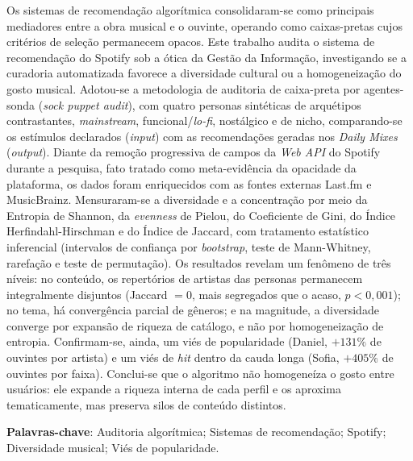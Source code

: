 \documentclass[12pt, %
openright,
oneside, %
a4paper,    %
english,   %
brazil]{facom-ufu-abntex2}
\begin{document}
\begin{resumo}
Os sistemas de recomendação algorítmica consolidaram-se como principais
mediadores entre a obra musical e o ouvinte, operando como caixas-pretas cujos
critérios de seleção permanecem opacos. Este trabalho audita o sistema de
recomendação do Spotify sob a ótica da Gestão da Informação, investigando se a
curadoria automatizada favorece a diversidade cultural ou a homogeneização do
gosto musical. Adotou-se a metodologia de auditoria de caixa-preta por
agentes-sonda (\emph{sock puppet audit}), com quatro personas sintéticas de
arquétipos contrastantes, \emph{mainstream}, funcional/\emph{lo-fi},
nostálgico e de nicho, comparando-se os estímulos declarados (\emph{input})
com as recomendações geradas nos \emph{Daily Mixes} (\emph{output}). Diante da
remoção progressiva de campos da \emph{Web API} do Spotify durante a pesquisa,
fato tratado como meta-evidência da opacidade da plataforma, os dados
foram enriquecidos com as fontes externas Last.fm e MusicBrainz. Mensuraram-se a
diversidade e a concentração por meio da Entropia de Shannon, da \emph{evenness}
de Pielou, do Coeficiente de Gini, do Índice Herfindahl-Hirschman e do Índice de
Jaccard, com tratamento estatístico inferencial (intervalos de confiança por
\emph{bootstrap}, teste de Mann-Whitney, rarefação e teste de permutação). Os
resultados revelam um fenômeno de três níveis: no conteúdo, os repertórios de
artistas das personas permanecem integralmente disjuntos (Jaccard $= 0$, mais
segregados que o acaso, $p < 0{,}001$); no tema, há convergência parcial de
gêneros; e na magnitude, a diversidade converge por expansão de riqueza de
catálogo, e não por homogeneização de entropia. Confirmam-se, ainda, um viés de
popularidade (Daniel, $+131\%$ de ouvintes por artista) e um viés de \emph{hit}
dentro da cauda longa (Sofia, $+405\%$ de ouvintes por faixa). Conclui-se que o
algoritmo não homogeneíza o gosto entre usuários: ele expande a riqueza interna
de cada perfil e os aproxima tematicamente, mas preserva silos de conteúdo
distintos.

 \vspace{\onelineskip}

 \noindent
 \textbf{Palavras-chave}: Auditoria algorítmica; Sistemas de recomendação;
 Spotify; Diversidade musical; Viés de popularidade.
\end{resumo}
\end{document}
